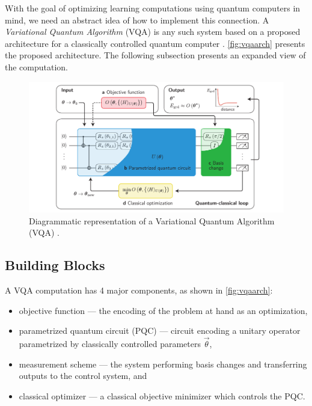 
With the goal of optimizing learning computations using quantum computers in
mind, we need an abstract idea of how to implement this connection. A
\emph{Variational Quantum Algorithm} (VQA) is any such system based on a
proposed architecture for a classically controlled quantum computer
\cite{bharti2021noisy}. \autoref{fig:vqaarch} presents the proposed
architecture. The following subsection presents an expanded view of the
computation.

\begin{figure}
    \centering
    \includegraphics[width=\textwidth]{figures/vqaarch.pdf}
    \caption{Diagrammatic representation of a Variational Quantum Algorithm
    (VQA) \cite[taken from][Figure 2]{bharti2021noisy}.}
    \label{fig:vqaarch}
\end{figure}


\subsection{Building Blocks}

A VQA computation has 4 major components, as shown in \autoref{fig:vqaarch}:

\begin{itemize}
    \item objective function --- the encoding of the problem at hand as an
            optimization,
    \item parametrized quantum circuit (PQC) --- circuit encoding a unitary
            operator parametrized by classically controlled parameters
            \(\vec{\theta}\),
    \item measurement scheme --- the system performing basis changes and
            transferring outputs to the control system, and
    \item classical optimizer --- a classical objective minimizer which controls
            the PQC.
\end{itemize}

